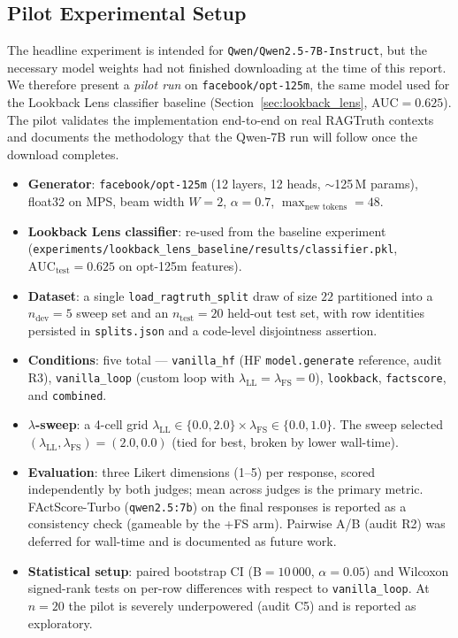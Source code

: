 \subsection{Pilot Experimental Setup}

The headline experiment is intended for \texttt{Qwen/Qwen2.5-7B-Instruct},
but the necessary model weights had not finished downloading at the time of
this report.  We therefore present a \emph{pilot run} on
\texttt{facebook/opt-125m}, the same model used for the Lookback Lens
classifier baseline (Section~\ref{sec:lookback_lens}, AUC$=0.625$).  The
pilot validates the implementation end-to-end on real RAGTruth contexts and
documents the methodology that the Qwen-7B run will follow once the
download completes.

\begin{itemize}
\item \textbf{Generator}: \texttt{facebook/opt-125m} (12 layers, 12 heads,
$\sim$125\,M params), float32 on MPS, beam width $W=2$, $\alpha=0.7$,
$\max_{\text{new tokens}}=48$.
\item \textbf{Lookback Lens classifier}: re-used from the baseline
experiment (\texttt{experiments/lookback\_lens\_baseline/results/classifier.pkl},
$\text{AUC}_{\text{test}}=0.625$ on opt-125m features).
\item \textbf{Dataset}: a single \texttt{load\_ragtruth\_split} draw of size
$22$ partitioned into a $n_{\text{dev}}=5$ sweep set and an
$n_{\text{test}}=20$ held-out test set, with row identities persisted in
\texttt{splits.json} and a code-level disjointness assertion.
\item \textbf{Conditions}: five total — \texttt{vanilla\_hf}
(HF \texttt{model.generate} reference, audit R3), \texttt{vanilla\_loop}
(custom loop with $\lambda_{\text{LL}}=\lambda_{\text{FS}}=0$),
\texttt{lookback}, \texttt{factscore}, and \texttt{combined}.
\item \textbf{$\lambda$-sweep}: a 4-cell grid
$\lambda_{\text{LL}} \in \{0.0, 2.0\} \times \lambda_{\text{FS}} \in
\{0.0, 1.0\}$.  The sweep selected $(\lambda_{\text{LL}}, \lambda_{\text{FS}})
=(2.0, 0.0)$ (tied for best, broken by lower wall-time).
\item \textbf{Evaluation}: three Likert dimensions (1--5) per response, scored
independently by both judges; mean across judges is the primary metric.
FActScore-Turbo (\texttt{qwen2.5:7b}) on the final responses is reported as a
consistency check (gameable by the +FS arm).  Pairwise A/B (audit R2) was
deferred for wall-time and is documented as future work.
\item \textbf{Statistical setup}: paired bootstrap CI
(B$=10\,000$, $\alpha=0.05$) and Wilcoxon signed-rank tests on
per-row differences with respect to \texttt{vanilla\_loop}.  At $n=20$ the
pilot is severely underpowered (audit C5) and is reported as exploratory.
\end{itemize}

